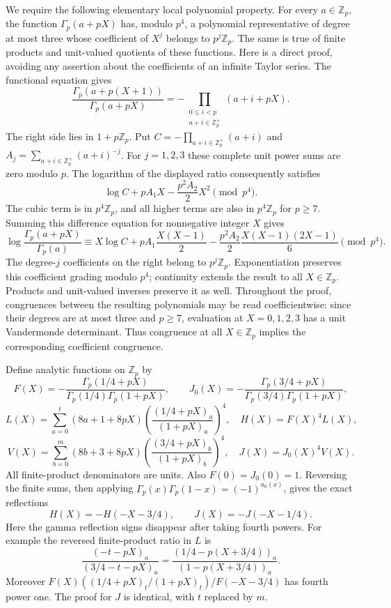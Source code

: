 \documentclass[11pt,letterpaper]{article}
\numberwithin{equation}{section}
\begin{document}
We require the following elementary local polynomial property.
For every $a\in\mathbb Z_p$, the function $\Gamma_p(a+pX)$
has, modulo $p^4$, a polynomial representative of degree at most
three whose coefficient of $X^j$ belongs to $p^j\mathbb Z_p$.
The same is true of finite products and unit-valued quotients of
these functions. Here is a direct proof, avoiding any assertion
about the coefficients of an infinite Taylor series. The functional
equation gives
\[
\frac{\Gamma_p(a+p(X+1))}{\Gamma_p(a+pX)}
=-\prod_{\substack{0\le i<p\\a+i\in\mathbb Z_p^\times}}(a+i+pX).
\]
The right side lies in $1+p\mathbb Z_p$. Put
$C=-\prod_{a+i\in\mathbb Z_p^\times}(a+i)$ and
$A_j=\sum_{a+i\in\mathbb Z_p^\times}(a+i)^{-j}$.
For $j=1,2,3$ these complete unit power sums are zero modulo $p$.
The logarithm of the displayed ratio consequently satisfies
\[
\log C+pA_1X-\frac{p^2A_2}{2}X^2\pmod{p^4}.
\]
The cubic term is in $p^4\mathbb Z_p$, and all higher terms
are also in $p^4\mathbb Z_p$ for $p\ge7$.
Summing this difference equation for nonnegative integer $X$ gives
\[
\log\frac{\Gamma_p(a+pX)}{\Gamma_p(a)}
\equiv X\log C+pA_1\frac{X(X-1)}2
-\frac{p^2A_2}{2}\frac{X(X-1)(2X-1)}6\pmod{p^4}.
\]
The degree-$j$ coefficients on the right belong to $p^j\mathbb Z_p$.
Exponentiation preserves this coefficient grading modulo $p^4$;
continuity extends the result to all $X\in\mathbb Z_p$.
Products and unit-valued inverses preserve it as well.
Throughout the proof, congruences between the resulting polynomials
may be read coefficientwise: since their degrees are at most three
and $p\ge7$, evaluation at $X=0,1,2,3$ has a unit Vandermonde
determinant. Thus congruence at all $X\in\mathbb Z_p$ implies the
corresponding coefficient congruence.

Define analytic functions on $\mathbb Z_p$ by
\[
F(X)=-\frac{\Gamma_p(1/4+pX)}
 {\Gamma_p(1/4)\Gamma_p(1+pX)},\qquad
J_0(X)=-\frac{\Gamma_p(3/4+pX)}
 {\Gamma_p(3/4)\Gamma_p(1+pX)},
\]
\[
L(X)=\sum_{a=0}^{t}(8a+1+8pX)
 \left(\frac{(1/4+pX)_a}{(1+pX)_a}\right)^4,
\quad H(X)=F(X)^4L(X),
\]
\[
V(X)=\sum_{b=0}^{m}(8b+3+8pX)
 \left(\frac{(3/4+pX)_b}{(1+pX)_b}\right)^4,
\quad J(X)=J_0(X)^4V(X).
\]
All finite-product denominators are units. Also $F(0)=J_0(0)=1$.
Reversing the finite sums, then applying
$\Gamma_p(x)\Gamma_p(1-x)=(-1)^{a_0(x)}$, gives the exact reflections
\begin{equation}\label{IV-G:reflect}
H(X)=-H(-X-3/4),\qquad J(X)=-J(-X-1/4).
\end{equation}
Here the gamma reflection signs disappear after taking fourth powers.
For example the reversed finite-product ratio in $L$ is
\[
\frac{(-t-pX)_a}{(3/4-t-pX)_a}
=\frac{(1/4-p(X+3/4))_a}{(1-p(X+3/4))_a}.
\]
Moreover
$F(X)((1/4+pX)_t/(1+pX)_t)/F(-X-3/4)$ has fourth power one.
The proof for $J$ is identical, with $t$ replaced by $m$.
\end{document}

